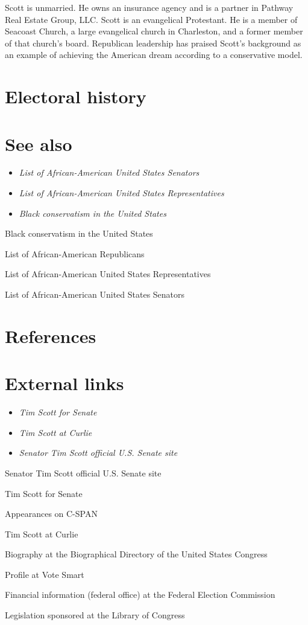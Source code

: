 Scott is unmarried. He owns an insurance agency and is a partner in
Pathway Real Estate Group, LLC. Scott is an evangelical Protestant. He
is a member of Seacoast Church, a large evangelical church in
Charleston, and a former member of that church's board. Republican
leadership has praised Scott's background as an example of achieving the
American dream according to a conservative model.

\section{Electoral history}\label{electoral-history}

\section{See also}\label{see-also}

\begin{itemize}
\item
  \emph{List of African-American United States Senators}
\item
  \emph{List of African-American United States Representatives}
\item
  \emph{Black conservatism in the United States}
\end{itemize}

Black conservatism in the United States

List of African-American Republicans

List of African-American United States Representatives

List of African-American United States Senators

\section{References}\label{references}

\section{External links}\label{external-links}

\begin{itemize}
\item
  \emph{Tim Scott for Senate}
\item
  \emph{Tim Scott at Curlie}
\item
  \emph{Senator Tim Scott official U.S. Senate site}
\end{itemize}

Senator Tim Scott official U.S. Senate site

Tim Scott for Senate

Appearances on C-SPAN

Tim Scott at Curlie

Biography at the Biographical Directory of the United States Congress

Profile at Vote Smart

Financial information (federal office) at the Federal Election
Commission

Legislation sponsored at the Library of Congress
